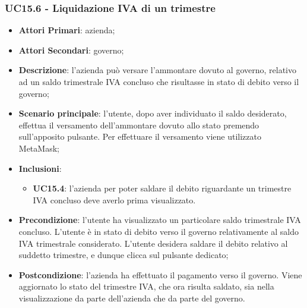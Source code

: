 \subsubsection{UC15.6 - Liquidazione IVA di un trimestre}
\begin{itemize}
	\item \textbf{Attori Primari}: azienda;
	\item \textbf{Attori Secondari}: governo;
	\item \textbf{Descrizione}: l'azienda può versare l'ammontare dovuto al governo, relativo ad un saldo trimestrale IVA concluso che risultasse in stato di debito verso il governo;
	\item \textbf{Scenario principale}: l'utente, dopo aver individuato il saldo desiderato, effettua il versamento dell'ammontare dovuto allo stato premendo sull'apposito pulsante. Per effettuare il versamento viene utilizzato MetaMask\glo;
	\item \textbf{Inclusioni}:
	\begin{itemize}
		\item \textbf{UC15.4}: l'azienda per poter saldare il debito riguardante un trimestre IVA concluso deve averlo prima visualizzato.
	\end{itemize}
	\item \textbf{Precondizione}: l'utente ha visualizzato un particolare saldo trimestrale IVA concluso. L'utente è in stato di debito verso il governo relativamente al saldo IVA trimestrale considerato. L'utente desidera saldare il debito relativo al suddetto trimestre, e dunque clicca sul pulsante dedicato;
	\item \textbf{Postcondizione}: l'azienda ha effettuato il pagamento verso il governo. Viene aggiornato lo stato del trimestre IVA, che ora risulta saldato, sia nella visualizzazione da parte dell'azienda che da parte del governo.
\end{itemize} 

